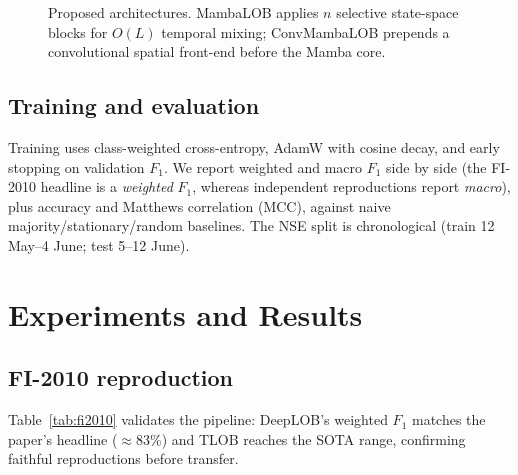 \documentclass[10pt,twocolumn]{article}
\begin{document}
\begin{figure}[t]
\centering
{}
\caption{Proposed architectures. MambaLOB applies $n$ selective state-space blocks for $O(L)$ temporal mixing;
ConvMambaLOB prepends a convolutional spatial front-end before the Mamba core.}
\label{fig:arch}
\end{figure}

\subsection{Training and evaluation}
Training uses class-weighted cross-entropy, AdamW with cosine decay, and early stopping on validation
$F_1$. We report weighted and macro $F_1$ side by side (the FI-2010 headline is a \emph{weighted} $F_1$,
whereas independent reproductions report \emph{macro}), plus accuracy and Matthews correlation (MCC), against
naive majority/stationary/random baselines. The NSE split is chronological (train 12 May--4 June; test
5--12 June).

\section{Experiments and Results}
\subsection{FI-2010 reproduction}
Table~\ref{tab:fi2010} validates the pipeline: DeepLOB's weighted $F_1$ matches the paper's headline
($\approx$83\%) and TLOB reaches the SOTA range, confirming faithful reproductions before transfer.
\end{document}

